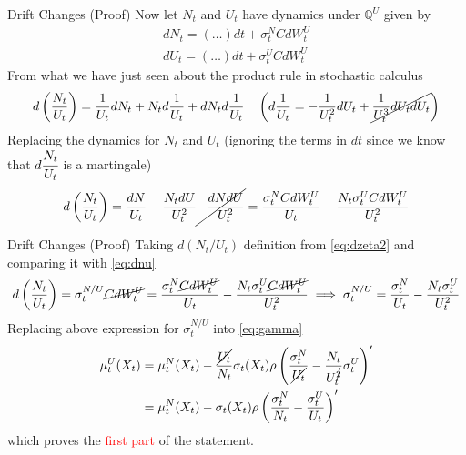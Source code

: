\documentclass{beamer}
\begin{document}
\begin{frame}{Drift Changes (Proof)}	
Now let $N_t$ and $U_t$ have dynamics under $\mathbb{Q}^U$ given by 
\begin{equation*}
	\begin{gathered}
		dN_t = (\ldots) dt + \sigma_t^NCdW^U_t\\
		dU_t = (\ldots) dt + \sigma_t^UCdW^U_t 
	\end{gathered}
\end{equation*}
	\pause
        From what we have just seen about the product rule in stochastic calculus
        \begin{equation*}
          \begin{gathered}
            d\left(\frac{N_t}{U_t}\right)=\frac{1}{U_t}dN_t+N_td\frac{1}{U_t}+dN_td\frac{1}{U_t} \quad \left(d\frac{1}{U_t}=-\frac{1}{U^2_t}dU_t+\cancel{\frac{1}{U^3_t}dU_tdU_t}\right) \\
          \end{gathered}
  \end{equation*}
	\pause
  Replacing the dynamics for $N_t$ and $U_t$ (ignoring the terms in $dt$ since we know that $d\cfrac{N_t}{U_t}$ is a martingale)
  \begin{equation}
    d\left(\frac{N_t}{U_t}\right) = \frac{dN}{U_t}-\frac{N_tdU}{U^2_t}\cancel{-\frac{dNdU}{U_t^2}}=\frac{\sigma^N_t CdW^U_t}{U_t} - \frac{N_t\sigma^U_t C dW^U_t}{U^2_t}
    \label{eq:dnu}
  \end{equation}
\end{frame}

\begin{frame}{Drift Changes (Proof)}   
  Taking $d(N_t/U_t)$ definition from \cref{eq:dzeta2} and comparing it with \cref{eq:dnu}
  \begin{equation}
    d\left(\frac{N_t}{U_t}\right)=\sigma_t^{N/U}\cancel{C dW^U_t} = \frac{\sigma^N_t \cancel{CdW^U_t}}{U_t} - \frac{N_t\sigma^U_t \cancel{C dW^U_t}}{U^2_t}\implies \sigma_t^{N/U}= \frac{\sigma^N_t}{U_t} - \frac{N_t\sigma^U_t}{U^2_t}
  \end{equation}
  Replacing above expression for $\sigma_t^{N/U}$ into \cref{eq:gamma}
  \begin{equation}
    \begin{aligned}
      \mu_t^U(X_t)&=\mu_t^N(X_t)-\frac{\cancel{U_t}}{N_t}\sigma_t(X_t)\rho\left(\frac{\sigma^N_t}{\cancel{U_t}} - \frac{N_t}{U_t^{\cancel{2}}}\sigma^U_t\right)'\\
      &=\mu_t^N(X_t)-\sigma_t(X_t)\rho\left(\frac{\sigma^N_t}{N_t} - \frac{\sigma^U_t}{U_t}\right)'
    \end{aligned}
  \end{equation}
  which proves the \textcolor{red}{first part} of the statement.
\end{frame}
\end{document}
